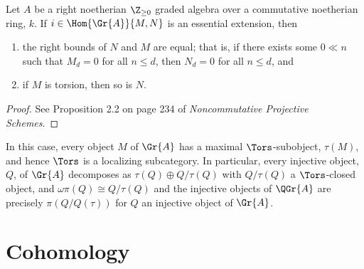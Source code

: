 \begin{prop}
  Let $A$ be a right noetherian $\Z_{\geq 0}$ graded algebra over a commutative noetherian ring, $k$.
  If $i \in \Hom{\Gr{A}}{M, N}$ is an essential extension, then
  \begin{enumerate}
  \item
    the right bounds of $N$ and $M$ are equal; that is, if there exists some $0 \ll n$ such that $M_d = 0$ for all $n \leq d$, then $N_d = 0$ for all $n \leq d$, and
  \item
    if $M$ is torsion, then so is $N$.
  \end{enumerate}
  \begin{proof}
    See Proposition 2.2 on page 234 of {\it Noncommutative Projective Schemes}.
  \end{proof}
\end{prop}

\begin{rmk}
  In this case, every object $M$ of $\Gr{A}$ has a maximal $\Tors$-subobject, $\tau(M)$, and hence $\Tors$ is a localizing subcategory.
  In particular, every injective object, $Q$, of $\Gr{A}$ decomposes as $\tau(Q) \oplus Q/\tau(Q)$ with $Q/\tau(Q)$ a $\Tors$-closed object, and $\omega\pi(Q) \cong Q/\tau(Q)$ and
  the injective objects of $\QGr{A}$ are precisely $\pi(Q/Q(\tau))$ for $Q$ an injective object of $\Gr{A}$.
\end{rmk}

\section{Cohomology}


